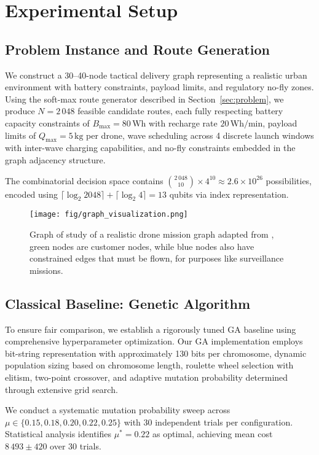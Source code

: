 \section{Experimental Setup}
\label{sec:experiments}

\subsection{Problem Instance and Route Generation}

We construct a 30--40-node tactical delivery graph representing a realistic urban environment with battery constraints, payload limits, and regulatory no-fly zones. Using the soft-max route generator described in Section~\ref{sec:problem}, we produce $N = 2\,048$ feasible candidate routes, each fully respecting battery capacity constraints of $B_{\max} = 80\,\text{Wh}$ with recharge rate $20\,\text{Wh/min}$, payload limits of $Q_{\max} = 5\,\text{kg}$ per drone, wave scheduling across 4 discrete launch windows with inter-wave charging capabilities, and no-fly constraints embedded in the graph adjacency structure.

The combinatorial decision space contains ${2\,048 \choose 10} \times 4^{10} \approx 2.6 \times 10^{26}$ possibilities, encoded using $\lceil\log_2 2048\rceil + \lceil\log_2 4\rceil = 13$ qubits via index representation.

\begin{figure}
    \centering
    \texttt{[image: fig/graph\_visualization.png]}
    \caption{Graph of study of a realistic drone mission graph adapted from \cite{davies_quantum_2024}, green nodes are customer nodes, while blue nodes also have constrained edges that must be flown, for purposes like surveillance missions. }
    \label{fig:problem_graph}
\end{figure}
\subsection{Classical Baseline: Genetic Algorithm}

To ensure fair comparison, we establish a rigorously tuned GA baseline using comprehensive hyperparameter optimization. Our GA implementation employs bit-string representation with approximately 130 bits per chromosome, dynamic population sizing based on chromosome length, roulette wheel selection with elitism, two-point crossover, and adaptive mutation probability determined through extensive grid search.

We conduct a systematic mutation probability sweep across $\mu \in \{0.15, 0.18, 0.20, 0.22, 0.25\}$ with 30 independent trials per configuration. Statistical analysis identifies $\mu^* = 0.22$ as optimal, achieving mean cost $8\,493 \pm 420$ over 30 trials.

